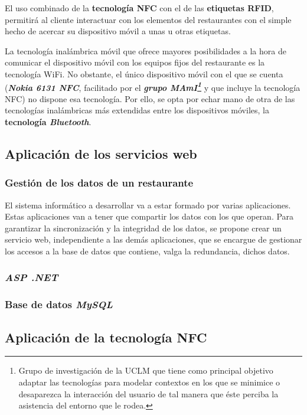   El uso combinado de la \textbf{tecnología \acs{NFC}} con el de las
  \textbf{etiquetas \acs{RFID}}, permitirá al cliente interactuar con los
  elementos del restaurantes con el simple hecho de acercar su dispositivo
  móvil a unas u otras etiquetas.

  La tecnología inalámbrica móvil que ofrece mayores posibilidades a la hora
  de comunicar el dispositivo móvil con los equipos fijos del restaurante es
  la tecnología \acs{WiFi}. No obstante, el único dispositivo móvil con el que
  se cuenta (\emph{\textbf{Nokia 6131 \acs{NFC}}}, facilitado por el
  \textbf{\emph{grupo \acs{MAmI}\footnote{Grupo de investigación de la
  \acs{UCLM} que tiene como principal objetivo adaptar las tecnologías para 
  modelar contextos en los que se minimice o desaparezca la interacción del 
  usuario de tal manera que éste perciba la asistencia del entorno que le 
  rodea.}}} y que incluye la tecnología \acs{NFC}) no
  dispone esa tecnología. Por ello, se opta por echar mano de otra de las
  tecnologías inalámbricas más extendidas entre los dispositivos móviles, la
  \textbf{tecnología \emph{Bluetooth}}.

  \subsection{Aplicación de los servicios web}
    \subsubsection{Gestión de los datos de un restaurante}
  El sistema informático a desarrollar va a estar formado por varias
  aplicaciones. Estas aplicaciones van a tener que compartir los datos con
  los que operan. Para garantizar la sincronización y la integridad de los
  datos, se propone crear un servicio web, independiente a las demás
  aplicaciones, que se encargue de gestionar los accesos a la base de datos
  que contiene, valga la redundancia, dichos datos.

    \subsubsection{\emph{ASP .NET}}

    \subsubsection{Base de datos \emph{MySQL}}

  \subsection{Aplicación de la tecnología \acs{NFC}}
